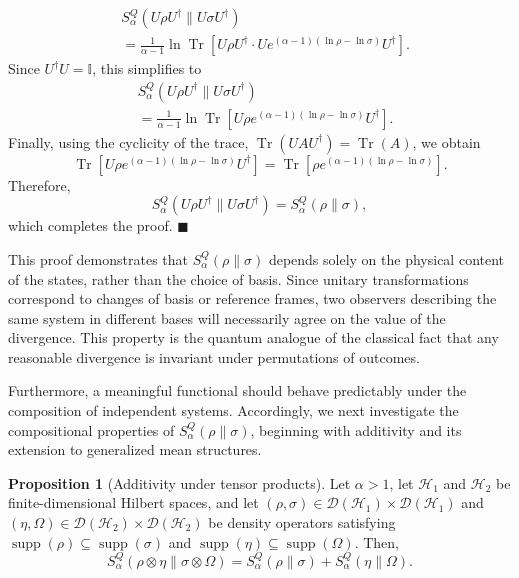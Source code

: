 \documentclass[a4paper, amsfonts, amssymb, amsmath, reprint, showkeys, nofootinbib, twoside, aps, pra]{revtex4-2}
\theoremstyle{definition}
\newtheorem{proposition}[theorem]{Proposition}
\renewenvironment{proof}{\noindent{\bfseries Proof.}}{\hfill$\blacksquare$}
\begin{document}
\begin{proof}
\begin{equation}
\begin{aligned}
&S^Q_\alpha(U\rho U^\dagger \| U\sigma U^\dagger) \\
&= \frac{1}{\alpha-1} \ln \operatorname{Tr} \left[ U\rho U^\dagger \cdot U e^{(\alpha-1)(\ln\rho-\ln\sigma)} U^\dagger \right].
\end{aligned}
\end{equation}
Since $U^\dagger U = \mathbb{I}$, this simplifies to
\begin{equation}
\begin{aligned}
&S^Q_\alpha(U\rho U^\dagger \| U\sigma U^\dagger) \\
&= \frac{1}{\alpha-1} \ln \operatorname{Tr} \left[ U\rho e^{(\alpha-1)(\ln\rho-\ln\sigma)} U^\dagger \right].
\end{aligned}
\end{equation}
Finally, using the cyclicity of the trace, $\operatorname{Tr}(UAU^\dagger) = 
\operatorname{Tr}(A)$, we obtain
\begin{equation}
\operatorname{Tr}
\left[
U\rho e^{(\alpha-1)(\ln\rho-\ln\sigma)} U^\dagger
\right]
=
\operatorname{Tr}
\left[
\rho e^{(\alpha-1)(\ln\rho-\ln\sigma)}
\right].
\end{equation}
Therefore,
\begin{equation}
S^Q_\alpha(U\rho U^\dagger \| U\sigma U^\dagger)
=
S^Q_\alpha(\rho \| \sigma),
\end{equation}
which completes the proof.
\end{proof}

This proof demonstrates that $S^Q_\alpha(\rho \| \sigma)$ depends solely on the physical content of the states, rather than the choice of basis. Since unitary transformations correspond to changes of basis or reference frames, two observers describing the same system in different bases will necessarily agree on the value of the divergence. This property is the quantum analogue of the classical fact that any reasonable divergence is invariant under permutations of outcomes.

Furthermore, a meaningful functional should behave predictably under the composition of independent systems. Accordingly, we next investigate the compositional properties of $S^Q_\alpha(\rho\|\sigma)$, beginning with additivity and its extension to generalized mean structures.


\begin{proposition}[Additivity under tensor products]
Let $\alpha >1$, let $\mathcal{H}_1$ and $\mathcal{H}_2$ 
be finite-dimensional Hilbert spaces, and let
$(\rho,\sigma) \in \mathcal{D}(\mathcal{H}_1) \times \mathcal{D}(\mathcal{H}_1)$ 
and $(\eta,\Omega) \in \mathcal{D}(\mathcal{H}_2) \times \mathcal{D}(\mathcal{H}_2)$
be density operators satisfying
$\operatorname{supp}(\rho)\subseteq\operatorname{supp}(\sigma)$ and
$\operatorname{supp}(\eta)\subseteq\operatorname{supp}(\Omega)$.
Then,
\begin{equation}
S^Q_{\alpha}(\rho \otimes \eta \| \sigma \otimes \Omega)
=
S^Q_{\alpha}(\rho \| \sigma)
+
S^Q_{\alpha}(\eta \| \Omega).
\label{eq:additivity}
\end{equation}
\end{proposition}
\end{document}
